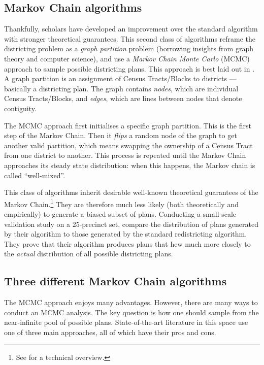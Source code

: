 \documentclass[]{article}
\begin{document}
\hypertarget{markov-chain-algorithms}{%
\subsection{Markov Chain algorithms}\label{markov-chain-algorithms}}

Thankfully, scholars have developed an improvement over the standard
algorithm with stronger theoretical guarantees. This second class of
algorithms reframe the districting problem as a \emph{graph partition}
problem (borrowing insights from graph theory and computer science), and
use a \emph{Markov Chain Monte Carlo} (MCMC) approach to sample possible
districting plans. This approach is best laid out in \cite{fifieldwp}. A
graph partition is an assignment of Census Tracts/Blocks to districts
--- basically a districting plan. The graph contains \emph{nodes}, which
are individual Census Tracts/Blocks, and \emph{edges}, which are lines
between nodes that denote contiguity.

The MCMC approach first initialises a specific graph partition. This is
the first step of the Markov Chain. Then it \emph{flips} a random node
of the graph to get another valid partition, which means swapping the
ownership of a Census Tract from one district to another. This process
is repeated until the Markov Chain approaches its steady state
distribution: when this happens, the Markov chain is called
``well-mixed''.

This class of algorithms inherit desirable well-known theoretical
guarantees of the Markov Chain.\footnote{See \cite{ddj2019recom} for a
  technical overview.} They are therefore much less likely (both
theoretically and empirically) to generate a biased subset of plans.
Conducting a small-scale validation study on a 25-precinct set,
\citeauthor{fifieldwp} compare the distribution of plans generated by
their algorithm to those generated by the standard redistricting
algorithm. They prove that their algorithm produces plans that hew much
more closely to the \emph{actual} distribution of all possible
districting plans.

\hypertarget{three-different-markov-chain-algorithms}{%
\subsection{Three different Markov Chain
algorithms}\label{three-different-markov-chain-algorithms}}

The MCMC approach enjoys many advantages. However, there are many ways
to conduct an MCMC analysis. The key question is how one should sample
from the near-infinite pool of possible plans. State-of-the-art
literature in this space use one of three main approaches, all of which
have their pros and cons.
\end{document}
